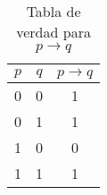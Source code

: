 \documentclass[letterpaper, 12pt]{article}
\begin{document}
\begin{table}[h!]
\centering
\begin{tabular}{|c|c|c|} \hline
$p$ & $q$ & $p\rightarrow q$\\\hline
0 & 0 & 1 \\
0 & 1 & 1 \\
1 & 0 & 0 \\
1 & 1 & 1 \\\hline
\end{tabular}
\caption{Tabla de verdad para
$p \rightarrow q$}
\end{table}
\end{document}
